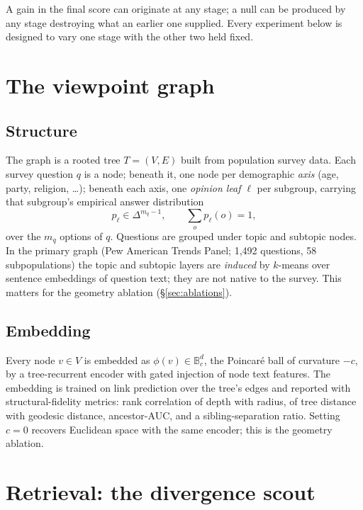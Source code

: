 \documentclass[11pt]{article}
\newcommand{\ball}{\mathbb{B}}
\newcommand{\simplex}{\Delta}
\begin{document}
A gain in the final score can originate at any stage; a null can be produced by
any stage destroying what an earlier one supplied. Every experiment below is
designed to vary one stage with the other two held fixed.

\section{The viewpoint graph}

\subsection{Structure}

The graph is a rooted tree $T = (V, E)$ built from population survey data. Each
survey question $q$ is a node; beneath it, one node per demographic
\emph{axis} (age, party, religion, \dots); beneath each axis, one \emph{opinion
leaf} $\ell$ per subgroup, carrying that subgroup's empirical answer
distribution
\[
  p_\ell \in \simplex^{m_q - 1}, \qquad \textstyle\sum_o p_\ell(o) = 1,
\]
over the $m_q$ options of $q$. Questions are grouped under topic and subtopic
nodes. In the primary graph (Pew American Trends Panel; 1{,}492 questions, 58
subpopulations) the topic and subtopic layers are \emph{induced} by $k$-means
over sentence embeddings of question text; they are not native to the survey.
This matters for the geometry ablation (\S\ref{sec:ablations}).

\subsection{Embedding}

Every node $v \in V$ is embedded as $\phi(v) \in \ball^d_c$, the Poincar\'e ball
of curvature $-c$, by a tree-recurrent encoder with gated injection of node
text features. The embedding is trained on link prediction over the tree's
edges and reported with structural-fidelity metrics: rank correlation of depth
with radius, of tree distance with geodesic distance, ancestor-AUC, and a
sibling-separation ratio. Setting $c = 0$ recovers Euclidean space with the
same encoder; this is the geometry ablation.

\section{Retrieval: the divergence scout}
\end{document}
